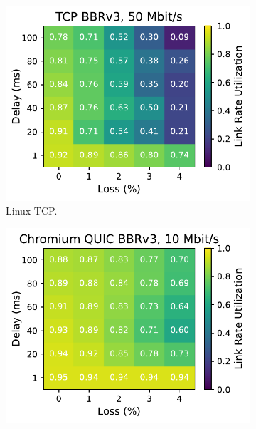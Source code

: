 \begin{figure}[ht]
\begin{subfigure}[b]{0.22\linewidth}
        \includegraphics[width=\linewidth,trim={0 0 2cm 0},clip]{splitting-paper/figures/heatmaps/heatmap_tcp_bbr3_50mbps.pdf}
        \caption{Linux TCP.}
    \end{subfigure}
    \begin{subfigure}[b]{0.22\linewidth}
        \includegraphics[width=\linewidth,trim={0 0 2cm 0},clip]{splitting-paper/figures/heatmaps/heatmap_quic_bbr3_10mbps.pdf}

\end{subfigure}
\end{figure}
